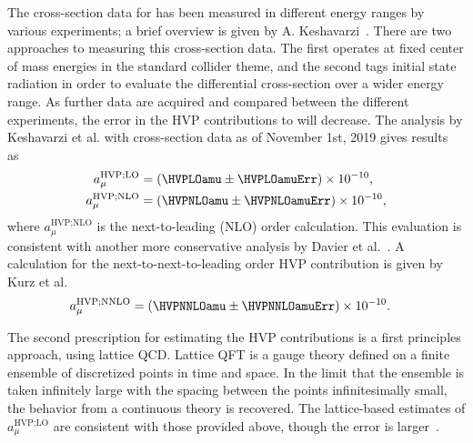 

The cross-section data for  has been measured in different energy ranges by various experiments; a brief overview is given by A. Keshavarzi~\cite{HadronDataOverview}. There are two approaches to measuring this cross-section data. The first operates at fixed center of mass energies in the standard collider theme, and the second tags initial state radiation in order to evaluate the differential cross-section over a wider energy range. As further data are acquired and compared between the different experiments, the error in the HVP contributions to \amu will decrease. The analysis by Keshavarzi et al. with cross-section data as of November 1st, 2019 gives results as~\cite{Keshavarzi:2018mgv,Keshavarzi:2019abf}
		\begin{equation}
		\begin{aligned}
            a_{\mu}^{\text{HVP;LO}} &= (\HVPLOamu \pm \HVPLOamuErr) \times 10^{-10}, \\
            a_{\mu}^{\text{HVP;NLO}} &= (\HVPNLOamu \pm \HVPNLOamuErr) \times 10^{-10}, 
		\end{aligned}
		\end{equation}
where $a_{\mu}^{\text{HVP;NLO}}$ is the next-to-leading (NLO) order calculation. This evaluation is consistent with another more conservative analysis by Davier et al.~\cite{HVP2,Davier:2019can}. A calculation for the next-to-next-to-leading order HVP contribution is given by Kurz et al.~\cite{Kurz:2014wya}
		\begin{equation}
		\begin{aligned}
            a_{\mu}^{\text{HVP;NNLO}} &= (\HVPNNLOamu \pm \HVPNNLOamuErr) \times 10^{-10}. 
		\end{aligned}
		\end{equation}



The second prescription for estimating the HVP contributions is a first principles approach, using lattice QCD. Lattice QFT is a gauge theory defined on a finite ensemble of discretized points in time and space. In the limit that the ensemble is taken infinitely large with the spacing between the points infinitesimally small, the behavior from a continuous theory is recovered. The lattice-based estimates of $a_{\mu}^{\text{HVP;LO}}$ are consistent with those provided above, though the error is larger~\cite{Lattice}. 

